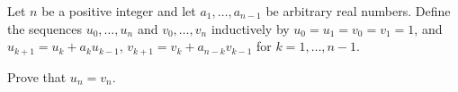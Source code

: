 Let $n$ be a positive integer and let $a_1, \ldots, a_{n-1}$ be arbitrary real numbers.
Define the sequences $u_0, \ldots, u_n$ and $v_0, \ldots, v_n$ inductively by $u_0 = u_1  = v_0 = v_1 = 1$, and $u_{k+1} = u_k + a_k u_{k-1}$, $v_{k+1} = v_k + a_{n-k} v_{k-1}$ for $k=1, \ldots, n-1$.

Prove that $u_n = v_n.$
